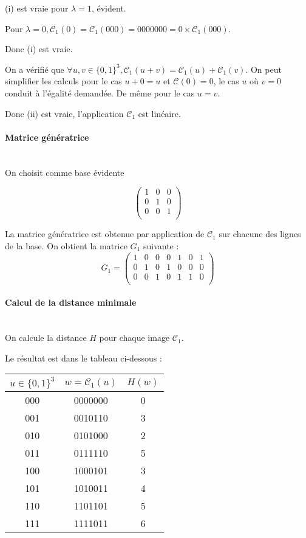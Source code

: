 \documentclass[a4paper,11pt]{article}
\begin{document}
(i) est vraie pour $\lambda=1$, évident.

Pour $\lambda=0, \mathcal{C}_1(0)=\mathcal{C}_1(000)=0000000=0\times \mathcal{C}_1(000)$.

Donc (i) est vraie.

On a vérifié que $\forall u,v \in \{0,1\}^3, \mathcal{C}_1(u+v)=\mathcal{C}_1(u)+\mathcal{C}_1(v)$. On peut simplifier les calculs pour le cas $u+0=u$ et $\mathcal{C}(0)=0$, le cas $u$ où $v=0$ conduit à l'égalité demandée. De même pour le cas $u=v$.

Donc (ii) est vraie, l'application $\mathcal{C}_1$ est linéaire.

\paragraph{Matrice génératrice}~\\
On choisit comme base évidente

\[
    \left (
    \begin{array}{ccc}
        1&0&0 \\
        0&1&0 \\
        0&0&1 \\
    \end{array}
    \right )
\]

La matrice génératrice est obtenue par application de $\mathcal{C}_1$ sur chacune des lignes de la base.
On obtient la matrice $G_1$ suivante :
\[
    G_1=
    \left (
    \begin{array}{ccccccc}
        1&0&0&0&1&0&1 \\
        0&1&0&1&0&0&0 \\
        0&0&1&0&1&1&0 \\
    \end{array}
    \right )
\]

\paragraph{Calcul de la distance minimale}~\\

On calcule la distance $H$ pour chaque image $\mathcal{C}_1$.


Le résultat est dans le tableau ci-dessous :

\vspace{2ex}

\begin{tabular}{|c|c|c|}
    \hline
    $u\in\{0,1\}^3$ & $w=\mathcal{C}_1(u)$ & $H(w)$ \\
    \hline
    000 & 0000000 & 0 \\
    001 & 0010110 & 3 \\
    010 & 0101000 & 2 \\  
    011 & 0111110 & 5 \\
    100 & 1000101 & 3 \\
    101 & 1010011 & 4 \\
    110 & 1101101 & 5 \\
    111 & 1111011 & 6 \\
    \hline
\end{tabular}
\end{document}

